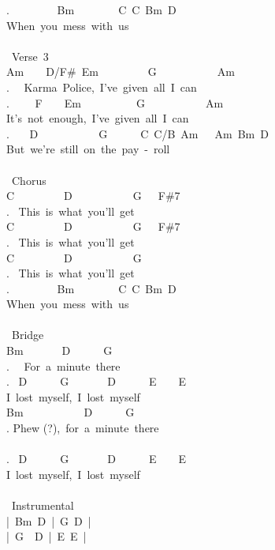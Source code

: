 {. \ \ \ \ \ \ \ \ Bm\ \ \ \ \ \ \ \ C\ C\ Bm\ D\\
When\ you\ mess\ with\ us\\
\\
\lbrack\ Verse\ 3\rbrack\\
Am\ \ \ \ D/F\#\ Em\ \ \ \ \ \ \ \ \ G\ \ \ \ \ \ \ \ \ \ \ Am\\
. \ \ Karma\ Police,\ I've\ given\ all\ I\ can\\
. \ \ \ \ F\ \ \ \ Em\ \ \ \ \ \ \ \ \ \ G\ \ \ \ \ \ \ \ \ \ \ Am\\
It's\ not\ enough,\ I've\ given\ all\ I\ can\\
. \ \ \ D\ \ \ \ \ \ \ \ \ \ \ G\ \ \ \ \ \ C\ C/B\ Am\ \ \ Am\ Bm\ D\\
But\ we're\ still\ on\ the\ pay\ -\ roll\\
\\
\lbrack\ Chorus\rbrack\\
C\ \ \ \ \ \ \ \ \ D\ \ \ \ \ \ \ \ \ \ \ G\ \ \ F\#7\\
. \ This\ is\ what\ you'll\ get\\
C\ \ \ \ \ \ \ \ \ D\ \ \ \ \ \ \ \ \ \ \ G\ \ \ F\#7\\
. \ This\ is\ what\ you'll\ get\\
C\ \ \ \ \ \ \ \ \ D\ \ \ \ \ \ \ \ \ \ \ G\\
. \ This\ is\ what\ you'll\ get\\
. \ \ \ \ \ \ \ \ Bm\ \ \ \ \ \ \ \ C\ C\ Bm\ D\\
When\ you\ mess\ with\ us\\
\\
\lbrack\ Bridge\rbrack\\
Bm\ \ \ \ \ \ \ D\ \ \ \ \ \ G\\
. \ \ For\ a\ minute\ there\\
. \ D\ \ \ \ \ \ G\ \ \ \ \ \ \ D\ \ \ \ \ \ E\ \ \ \ E\\
I\ lost\ myself,\ I\ lost\ myself\\
Bm\ \ \ \ \ \ \ \ \ \ \ D\ \ \ \ \ \ G\\
. Phew (?),\ for\ a\ minute\ there\\
\\
. \ D\ \ \ \ \ \ G\ \ \ \ \ \ \ D\ \ \ \ \ \ E\ \ \ \ E\\
I\ lost\ myself,\ I\ lost\ myself\\
\\
\lbrack\ Instrumental\rbrack\\
|\ Bm\ D\ |\ G\ D\ |\\
|\ G\ \ D\ |\ E\ E\ |\\
}

